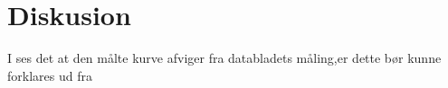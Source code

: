 \section{Diskusion}


I  ses det at den målte kurve afviger fra databladets måling,er dette bør kunne forklares ud fra 
